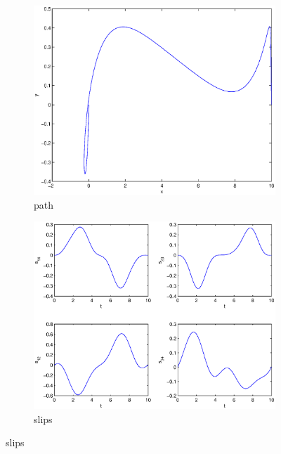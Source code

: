 \begin{figure}
\begin{subfigure}[b]{\textwidth}
\centering
\includegraphics[height=0.3\textheight]{img/final_1_1_10_path.eps}
\caption{path}
\end{subfigure}

\begin{subfigure}[b]{\textwidth}
\centering
\includegraphics[height=0.3\textheight]{img/final_1_1_10_slips.eps}
\caption{slips}
\end{subfigure}


\end{figure}
